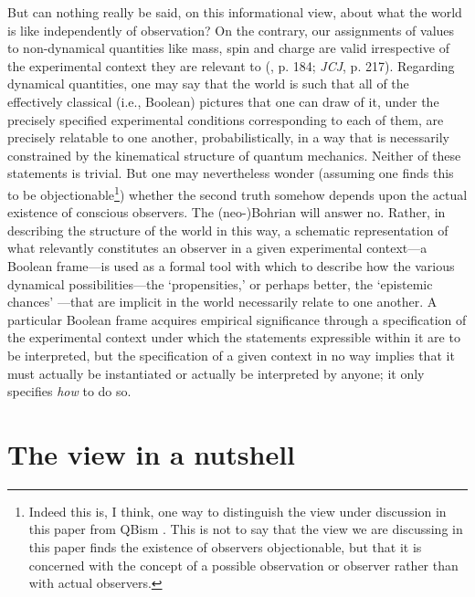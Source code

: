 \documentclass[12pt,english,twoside]{article}
\numberwithin{equation}{section}
\begin{document}
But can nothing really be said, on this informational view, about what the world is like independently of observation? On the contrary, our assignments of values to non-dynamical quantities like mass, spin and charge are valid irrespective of the experimental context they are relevant to (\citealt{demopoulosOnTheories}, p. 184; \emph{JCJ}, p. 217). Regarding dynamical quantities, one may say that the world is such that all of the effectively classical (i.e., Boolean) pictures that one can draw of it, under the precisely specified experimental conditions corresponding to each of them, are precisely relatable to one another, probabilistically, in a way that is necessarily constrained by the kinematical structure of quantum mechanics. Neither of these statements is trivial. But one may nevertheless wonder (assuming one finds this to be objectionable\footnote{Indeed this is, I think, one way to distinguish the view under discussion in this paper from QBism \citep[]{fuchs2017}. This is not to say that the view we are discussing in this paper finds the existence of observers objectionable, but that it is concerned with the concept of a possible observation or observer rather than with actual observers.}) whether the second truth somehow depends upon the actual existence of conscious observers. The (neo-)Bohrian will answer no. Rather, in describing the structure of the world in this way, a schematic representation of what relevantly constitutes an observer in a given experimental context---a Boolean frame---is used as a formal tool with which to describe how the various dynamical possibilities---the `propensities,' or perhaps better, the `epistemic chances' \citep[ch. 5]{myrvold2021}---that are implicit in the world necessarily relate to one another. A particular Boolean frame acquires empirical significance through a specification of the experimental context under which the statements expressible within it are to be interpreted, but the specification of a given context in no way implies that it must actually be instantiated or actually be interpreted by anyone; it only specifies \emph{how} to do so.

\section{The view in a nutshell}
\label{sec:nutshell}
\end{document}
